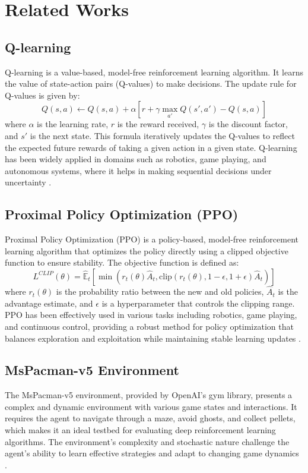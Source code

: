 \documentclass[final,numbers]{article}
\begin{document}
\section{Related Works}
\subsection{Q-learning}
Q-learning is a value-based, model-free reinforcement learning algorithm. It learns the value of state-action pairs (Q-values) to make decisions. The update rule for Q-values is given by:
\begin{equation}
Q(s, a) \leftarrow Q(s, a) + \alpha \left[ r + \gamma \max_{a'} Q(s', a') - Q(s, a) \right]
\end{equation}
where \(\alpha\) is the learning rate, \(r\) is the reward received, \(\gamma\) is the discount factor, and \(s'\) is the next state. This formula iteratively updates the Q-values to reflect the expected future rewards of taking a given action in a given state. Q-learning has been widely applied in domains such as robotics, game playing, and autonomous systems, where it helps in making sequential decisions under uncertainty \cite{mnih2015human}.

\subsection{Proximal Policy Optimization (PPO)}
Proximal Policy Optimization (PPO) is a policy-based, model-free reinforcement learning algorithm that optimizes the policy directly using a clipped objective function to ensure stability. The objective function is defined as:
\begin{equation}
L^{CLIP}(\theta) = \hat{\mathbb{E}}_t \left[ \min \left( r_t(\theta) \hat{A}_t, \text{clip}\left( r_t(\theta), 1 - \epsilon, 1 + \epsilon \right) \hat{A}_t \right) \right]
\end{equation}
where \(r_t(\theta)\) is the probability ratio between the new and old policies, \(\hat{A}_t\) is the advantage estimate, and \(\epsilon\) is a hyperparameter that controls the clipping range. PPO has been effectively used in various tasks including robotics, game playing, and continuous control, providing a robust method for policy optimization that balances exploration and exploitation while maintaining stable learning updates \cite{schulman2017proximal}.

\subsection{MsPacman-v5 Environment}
The MsPacman-v5 environment, provided by OpenAI's gym library, presents a complex and dynamic environment with various game states and interactions. It requires the agent to navigate through a maze, avoid ghosts, and collect pellets, which makes it an ideal testbed for evaluating deep reinforcement learning algorithms. The environment's complexity and stochastic nature challenge the agent's ability to learn effective strategies and adapt to changing game dynamics \cite{bellemare2013arcade}.
\end{document}
